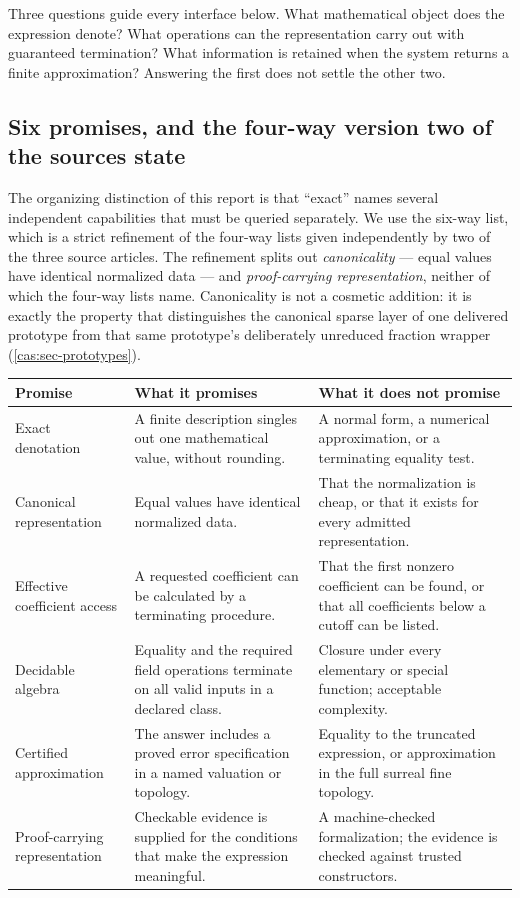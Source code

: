 \documentclass[11pt,letterpaper]{article}
\numberwithin{equation}{section}
\theoremstyle{definition}
\theoremstyle{remark}
\begin{document}
Three questions guide every interface below. What mathematical object does the
expression denote? What operations can the representation carry out with
guaranteed termination? What information is retained when the system returns a
finite approximation? Answering the first does not settle the other two.

\subsection{Six promises, and the four-way version two of the sources state}
\label{cas:sub-promises}
The organizing distinction of this report is that ``exact'' names several
independent capabilities that must be queried separately. We use the six-way
list, which is a strict refinement of the four-way lists given independently by
two of the three source articles. The refinement splits out
\emph{canonicality} --- equal values have identical normalized data --- and
\emph{proof-carrying representation}, neither of which the four-way lists name.
Canonicality is not a cosmetic addition: it is exactly the property that
distinguishes the canonical sparse layer of one delivered prototype from that
same prototype's deliberately unreduced fraction wrapper
(\cref{cas:sec-prototypes}).

\begingroup\small
\begin{longtable}{@{}P{0.22\textwidth}P{0.35\textwidth}P{0.36\textwidth}@{}}
\toprule
Promise & What it promises & What it does not promise\\
\midrule\endhead
Exact denotation & A finite description singles out one mathematical value,
without rounding. & A normal form, a numerical approximation, or a terminating
equality test.\\[0.45em]
Canonical representation & Equal values have identical normalized data. &
That the normalization is cheap, or that it exists for every admitted
representation.\\[0.45em]
Effective coefficient access & A requested coefficient can be calculated by a
terminating procedure. & That the first nonzero coefficient can be found, or
that all coefficients below a cutoff can be listed.\\[0.45em]
Decidable algebra & Equality and the required field operations terminate on all
valid inputs in a declared class. & Closure under every elementary or special
function; acceptable complexity.\\[0.45em]
Certified approximation & The answer includes a proved error specification in a
named valuation or topology. & Equality to the truncated expression, or
approximation in the full surreal fine topology.\\[0.45em]
Proof-carrying representation & Checkable evidence is supplied for the
conditions that make the expression meaningful. & A machine-checked
formalization; the evidence is checked against trusted constructors.\\
\bottomrule
\end{longtable}
\endgroup
\end{document}
